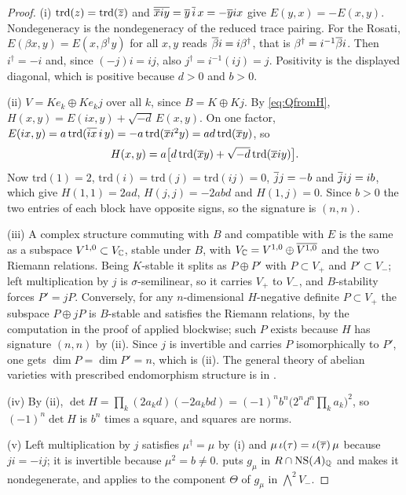 \begin{proof}
(i) $\mathrm{trd}(z)=\mathrm{trd}(\overline{z})$ and
$\overline{\overline{x}iy}=\overline{y}\,\overline{i}\,x=-\overline{y}ix$ give
$E(y,x)=-E(x,y)$. Nondegeneracy is the nondegeneracy of the reduced trace
pairing. For the Rosati, $E(\beta x,y)=E(x,\beta^{\dagger}y)$ for all $x,y$
reads $\overline{\beta}i=i\beta^{\dagger}$, that is
$\beta^{\dagger}=i^{-1}\overline{\beta}i$. Then $i^{\dagger}=-i$ and, since
$(-j)i=ij$, also $j^{\dagger}=i^{-1}(ij)=j$. Positivity is the displayed
diagonal, which is positive because $d>0$ and $b>0$.

(ii) $V=Ke_{k}\oplus Ke_{k}j$ over all $k$, since $B=K\oplus Kj$. By
\eqref{eq:QfromH}, $H(x,y)=E(ix,y)+\sqrt{-d}\,E(x,y)$. On one factor,
$E(ix,y)=a\,\mathrm{trd}(\overline{ix}\,i\,y)=-a\,\mathrm{trd}(\overline{x}i^{2}y)
=ad\,\mathrm{trd}(\overline{x}y)$, so
\[
  H(x,y)=a\bigl[d\,\mathrm{trd}(\overline{x}y)+\sqrt{-d}\,\mathrm{trd}(\overline{x}iy)\bigr].
\]
Now $\mathrm{trd}(1)=2$, $\mathrm{trd}(i)=\mathrm{trd}(j)=\mathrm{trd}(ij)=0$,
$\overline{j}j=-b$ and $\overline{j}ij=ib$, which give $H(1,1)=2ad$,
$H(j,j)=-2abd$ and $H(1,j)=0$. Since $b>0$ the two entries of each block have
opposite signs, so the signature is $(n,n)$.

(iii) A complex structure commuting with $B$ and compatible with $E$ is the
same as a subspace $V^{1,0}\subset V_{\mathbb{C}}$, stable under $B$, with
$V_{\mathbb{C}}=V^{1,0}\oplus\overline{V^{1,0}}$ and the two Riemann relations. Being
$K$-stable it splits as $P\oplus P'$ with $P\subset V_{+}$ and
$P'\subset V_{-}$; left multiplication by $j$ is $\sigma$-semilinear, so it
carries $V_{+}$ to $V_{-}$, and $B$-stability forces $P'=jP$. Conversely, for
any $n$-dimensional $H$-negative definite $P\subset V_{+}$ the subspace
$P\oplus jP$ is $B$-stable and satisfies the Riemann relations, by the
computation in the proof of  applied blockwise; such $P$
exists because $H$ has signature $(n,n)$ by (ii). Since $j$ is invertible and
carries $P$ isomorphically to $P'$, one gets $\dim P=\dim P'=n$, which is
(ii). The general theory of abelian varieties with
prescribed endomorphism structure is in \cite[Ch.~9]{BL04}.

(iv) By (ii), $\det H=\prod_{k}(2a_{k}d)(-2a_{k}bd)=(-1)^{n}b^{n}\bigl(2^{n}d^{n}
\prod_{k}a_{k}\bigr)^{2}$, so $(-1)^{n}\det H$ is $b^{n}$ times a square, and
squares are norms.

(v) Left multiplication by $j$ satisfies $\mu^{\dagger}=\mu$ by (i) and
$\mu\,\iota(\tau)=\iota(\overline{\tau})\,\mu$ because $ji=-ij$; it is invertible
because $\mu^{2}=b\ne0$.  puts $g_{\mu}$ in
$R\cap\mathrm{NS}(A)_{\mathbb{Q}}$ and makes it nondegenerate, and
 applies to the component $\Theta$ of $g_{\mu}$ in
$\bigwedge^{2}V_{-}$.
\end{proof}

